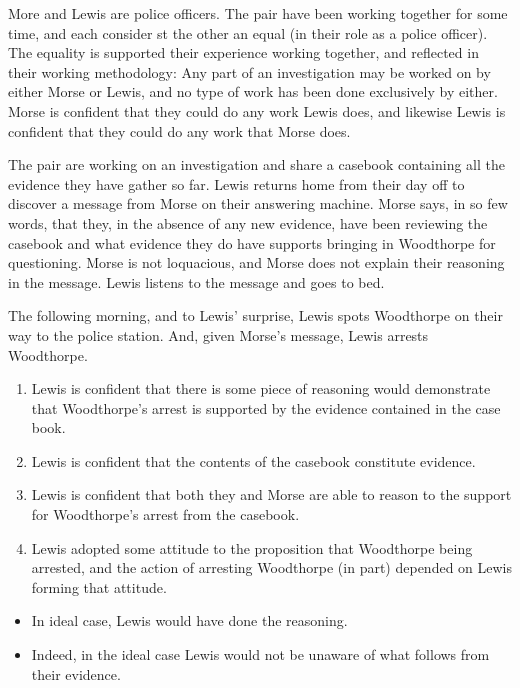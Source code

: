 \documentclass[10pt]{article}
\begin{document}
\begin{scenario}
  More and Lewis are police officers.
  The pair have been working together for some time, and each consider st the other an equal (in their role as a police officer).
  The equality is supported their experience working together, and reflected in their working methodology:
  Any part of an investigation may be worked on by either Morse or Lewis, and no type of work has been done exclusively by either.
  Morse is confident that they could do any work Lewis does, and likewise Lewis is confident that they could do any work that Morse does.

  The pair are working on an investigation and share a casebook containing all the evidence they have gather so far.
  Lewis returns home from their day off to discover a message from Morse on their answering machine.
  Morse says, in so few words, that they, in the absence of any new evidence, have been reviewing the casebook and what evidence they do have supports bringing in Woodthorpe for questioning.
  Morse is not loquacious, and Morse does not explain their reasoning in the message.
  Lewis listens to the message and goes to bed.

  The following morning, and to Lewis' surprise, Lewis spots Woodthorpe on their way to the police station.
  And, given Morse's message, Lewis arrests Woodthorpe.
\end{scenario}

\begin{enumerate}
\item Lewis is confident that there is some piece of reasoning would demonstrate that Woodthorpe's arrest is supported by the evidence contained in the case book.
\item Lewis is confident that the contents of the casebook constitute evidence.
\item Lewis is confident that both they and Morse are able to reason to the support for Woodthorpe's arrest from the casebook.
\item Lewis adopted some attitude to the proposition that Woodthorpe being arrested, and the action of arresting Woodthorpe (in part) depended on Lewis forming that attitude.
\end{enumerate}

\begin{itemize}
\item In ideal case, Lewis would have done the reasoning.
\item Indeed, in the ideal case Lewis would not be unaware of what follows from their evidence.
\end{itemize}
\end{document}
